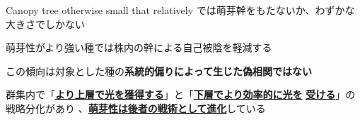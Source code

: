 \documentclass[a0, 25, plainboxedsections]{sciposter} %
\begin{document}
\begin{multicols}{2}
\begin{mdframed}[style=conclusion.frame,frametitle={\textbf{\Large{\faFlagAlt \vspace{0.02em} CONCLUSION: {Sprout ability is  against tree height is は樹高と背反的に進化しており、\\\hspace*{2.8em}群集の中に多様な萌芽性をもつ種が存在する}}}}]
{    \faCaretRight Canopy tree otherwise small that relatively では萌芽幹をもたないか、わずかな大きさでしかない
    
    \faCaretRight 萌芽性がより強い種では株内の幹による自己被陰を軽減する
    
    \faCaretRight この傾向は対象とした種の\textbf{系統的偏りによって生じた偽相関ではない}
  }
  
  \vspace{0.4em}
  \faHandLeft 群集内で「\textbf{\underline{より上層で光を獲得する}}」と「\textbf{\underline{下層でより効率的に光を}} \textbf{\underline{受ける}}」の戦略分化があり
  、\textbf{\underline{萌芽性は後者の戦術として進化}}している
 
\end{mdframed}

\end{multicols}
\begin{mdframed}[style=section.frame]
  \centering\LARGE\textbf{\color{white}{MATERIALS AND METHODS}}
\end{mdframed}\vspace{-1.2em}
\end{document}
